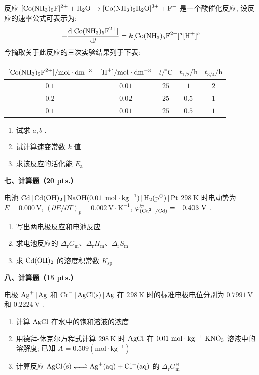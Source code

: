 反应 $\ce{[Co(NH_{3})_{5}F]^{2+} + H_{2}O \to [Co(NH_{3})_{5}H_{2}O]^{3+} + F^{-}}$ 是一个酸催化反应, 设反应的速率公式可表示为:
\[
-\frac{\mathrm{d}[\ce{Co(NH_{3})_{5}F^{2+}}]}{\mathrm{d}t} = k[\ce{Co(NH_{3})_{5}F^{2+}}]^a[\ce{H^{+}}]^b
\]
今摘取关于此反应的三次实验结果列于下表:

\begin{center}
\begin{tabular}{ccccc}
$[\ce{Co(NH_{3})_{5}F^{2+}}]/\mathrm{mol\cdot dm^{-3}}$ & $[\ce{H^{+}}]/\mathrm{mol\cdot dm^{-3}}$ & $t/^\circ\mathrm{C}$ & $t_{1/2}/\mathrm{h}$ & $t_{3/4}/\mathrm{h}$ \\
\hline
$0.1$ & $0.01$ & $25$ & $1$ & $2$ \\
$0.2$ & $0.02$ & $25$ & $0.5$ & $1$ \\
$0.1$ & $0.01$ & $25$ & $0.5$ & $1$ \\
\end{tabular}
\end{center}

\begin{enumerate}[label=(\arabic*), itemsep=1ex]
    \item 试求 $a, b$ .
    \item 试计算速变常数 $k$ 值
    \item 求该反应的活化能 $E_\mathrm{a}$
\end{enumerate}

\vspace{0.5cm}
\noindent\textbf{七、计算题（20 pts.）}

电池 $\ce{Cd | Cd(OH)_{2} | NaOH(0.01\ mol\cdot kg^{-1}) | H_{2}(p^\ominus) | Pt}$ $298\ \mathrm{K}$ 时电动势为 $E = 0.000\ \mathrm{V}$, $(\partial E/\partial T)_p = 0.002\ \mathrm{V\cdot K^{-1}}$, $\varphi^\ominus_{\ce{(Cd^{2+}/Cd)}} = -0.403\ \mathrm{V}$ .
\begin{enumerate}[label=(\arabic*), itemsep=1ex]
    \item 写出两电极反应和电池反应
    \item 求电池反应的 $\Delta_\mathrm{r}G_\mathrm{m}$、$\Delta_\mathrm{r}H_\mathrm{m}$、$\Delta_\mathrm{r}S_\mathrm{m}$
    \item 求 $\ce{Cd(OH)_{2}}$ 的溶度积常数 $K_\mathrm{sp}$
\end{enumerate}

\vspace{0.5cm}
\noindent\textbf{八、计算题（15 pts.）}

电极 $\ce{Ag^{+} | Ag}$ 和 $\ce{Cr^{-} | AgCl(s) | Ag}$ 在 $298\ \mathrm{K}$ 时的标准电极电位分别为 $0.7991\ \mathrm{V}$ 和 $0.2224\ \mathrm{V}$ .
\begin{enumerate}[label=(\arabic*), itemsep=1ex]
    \item 计算 $\ce{AgCl}$ 在水中的饱和溶液的浓度
    \item 用德拜-休克尔方程式计算 $298\ \mathrm{K}$ 时 $\ce{AgCl}$ 在 $0.01\ \mathrm{mol\cdot kg^{-1}}\ \ce{KNO_{3}}$ 溶液中的溶解度; 已知 $A = 0.509(\mathrm{mol\cdot kg^{-1}})$
    \item 计算反应 $\ce{AgCl(s) <=> Ag^{+}(aq) + Cl^{-}(aq)}$ 的 $\Delta_\mathrm{r}G_\mathrm{m}^\ominus$
\end{enumerate}